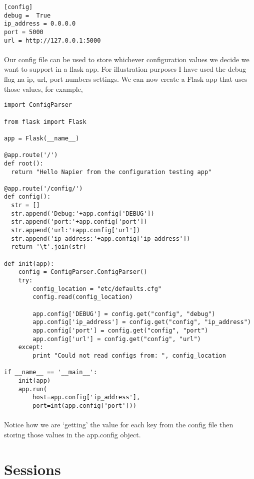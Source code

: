 \documentclass[12pt, a4paper, twoside]{book}
\begin{document}
\begin{lstlisting}
[config]
debug =  True
ip_address = 0.0.0.0
port = 5000
url = http://127.0.0.1:5000
\end{lstlisting}

\paragraph{} Our config file can be used to store whichever configuration values we decide we want to support in a flask app. For illustration purposes I have used the debug flag na ip, url, port numbers settings. We can now create a Flask app that uses those values, for example,

\begin{lstlisting}
import ConfigParser

from flask import Flask

app = Flask(__name__)

@app.route('/')
def root():
  return "Hello Napier from the configuration testing app"

@app.route('/config/')
def config():
  str = []
  str.append('Debug:'+app.config['DEBUG'])
  str.append('port:'+app.config['port'])
  str.append('url:'+app.config['url'])
  str.append('ip_address:'+app.config['ip_address'])
  return '\t'.join(str)

def init(app):
    config = ConfigParser.ConfigParser()
    try:
        config_location = "etc/defaults.cfg"
        config.read(config_location)
        
        app.config['DEBUG'] = config.get("config", "debug")
        app.config['ip_address'] = config.get("config", "ip_address")
        app.config['port'] = config.get("config", "port")
        app.config['url'] = config.get("config", "url")
    except:
        print "Could not read configs from: ", config_location

if __name__ == '__main__':
    init(app)
    app.run(
        host=app.config['ip_address'], 
        port=int(app.config['port']))
\end{lstlisting}

\paragraph{}  Notice how we are `getting' the value for each key from the config file then storing those values in the app.config object. 

\section{Sessions}
\label{sessions}
\end{document}
